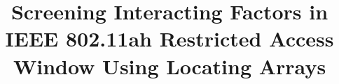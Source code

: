 \documentclass[review, 3p, 11pt]{elsarticle}
\begin{document}
\begin{frontmatter}


\title{Screening Interacting Factors in IEEE 802.11ah Restricted Access Window Using Locating Arrays}





















\end{frontmatter}
\end{document}
